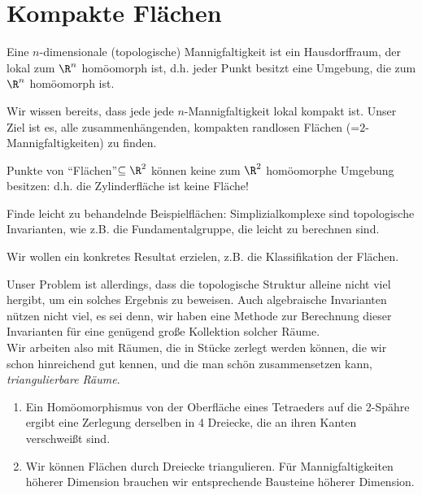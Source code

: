 \section{Kompakte Flächen}

\begin{bemn}[Erinnerung:]
Eine $n$-dimensionale (topologische) Mannigfaltigkeit ist ein Hausdorffraum,
der lokal zum $\R^n$ homöomorph ist, d.h. jeder Punkt besitzt eine Umgebung,
die zum $\R^n$ homöomorph ist.\maphere
\end{bemn}

Wir wissen bereits, dass jede jede $n$-Mannigfaltigkeit lokal kompakt ist.
Unser Ziel ist es, alle zusammenhängenden, kompakten randlosen Flächen
(=$2$-Mannigfaltigkeiten) zu finden.
\begin{bemn}
Punkte von ``Flächen''$\subseteq\R^2$ können keine zum $\R^2$ homöomorphe
Umgebung besitzen:
d.h. die Zylinderfläche ist keine Fläche!
\end{bemn}
\begin{bemn}[1. Annäherung:]
Finde leicht zu behandelnde Beispielflächen: Simplizialkomplexe sind 
topologische Invarianten, wie z.B. die Fundamentalgruppe, die leicht zu
berechnen sind.
\end{bemn}

Wir wollen ein konkretes Resultat erzielen, z.B. die Klassifikation der Flächen.

Unser Problem ist allerdings, dass die topologische Struktur alleine nicht viel
hergibt, um ein solches Ergebnis zu beweisen. Auch algebraische  Invarianten
nützen nicht viel, es sei denn, wir haben eine Methode zur Berechnung dieser
Invarianten für eine genügend große Kollektion solcher Räume.\\
Wir arbeiten also mit Räumen, die in Stücke zerlegt werden können, die wir
schon hinreichend gut kennen, und die man schön zusammensetzen kann,
\emph{triangulierbare Räume}.

\begin{bspn}
\begin{enumerate}[label=\arabic{*}.)]
  \item %
Ein Homöomorphismus von der Oberfläche eines Tetraeders auf die 2-Spähre ergibt
eine Zerlegung derselben in 4 Dreiecke, die an ihren Kanten verschweißt sind.
\item %
Wir können Flächen durch Dreiecke triangulieren. Für Mannigfaltigkeiten höherer
Dimension brauchen wir entsprechende Bausteine höherer Dimension.\bsphere
\end{enumerate}
\end{bspn}

